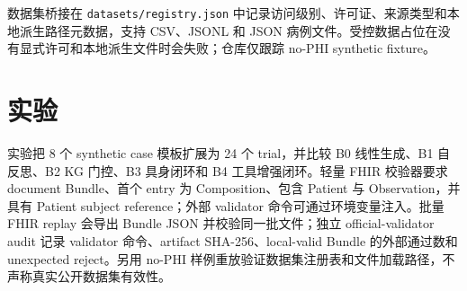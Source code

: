 \documentclass[11pt]{article}
\begin{document}
数据集桥接在 \texttt{datasets/registry.json} 中记录访问级别、许可证、来源类型和本地派生路径元数据，支持 CSV、JSONL 和 JSON 病例文件。受控数据占位在没有显式许可和本地派生文件时会失败；仓库仅跟踪 no-PHI synthetic fixture。

\section{实验}
实验把 8 个 synthetic case 模板扩展为 24 个 trial，并比较 B0 线性生成、B1 自反思、B2 KG 门控、B3 具身闭环和 B4 工具增强闭环。轻量 FHIR 校验器要求 document Bundle、首个 entry 为 Composition、包含 Patient 与 Observation，并具有 Patient subject reference；外部 validator 命令可通过环境变量注入。批量 FHIR replay 会导出 Bundle JSON 并校验同一批文件；独立 official-validator audit 记录 validator 命令、artifact SHA-256、local-valid Bundle 的外部通过数和 unexpected reject。另用 no-PHI 样例重放验证数据集注册表和文件加载路径，不声称真实公开数据集有效性。
\end{document}
